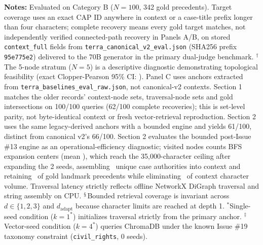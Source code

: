 \raggedright \fontsize{8.5}{10.5}\selectfont \textbf{Notes:} Evaluated on Category B ($N=100$, 342 gold precedents). Target coverage uses an exact CAP ID anywhere in context or a case-title prefix longer than four characters; complete recovery means every gold target matches, not independently verified connected-path recovery in Panels A/B, on stored \texttt{context\_full} fields from \texttt{terra\_canonical\_v2\_eval.json} (SHA256 prefix \texttt{95e775e2}) delivered to the 70B generator in the primary dual-judge benchmark.
$^\dagger$The 5-node stratum ($N=5$) is a descriptive diagnostic demonstrating topological feasibility (exact Clopper-Pearson 95\% CI: \CatBFiveNodeClopperPearsonCI).
Panel C uses anchors extracted from \texttt{terra\_baselines\_eval\_raw.json}, not canonical-v2 contexts. Section 1 matches the older records' context-node sets, traversal-node sets and gold intersections on 100/100 queries (62/100 complete recoveries); this is set-level parity, not byte-identical context or fresh vector-retrieval reproduction. Section 2 uses the same legacy-derived anchors with a bounded engine and yields 61/100, distinct from canonical v2's 66/100. Section 2 evaluates the bounded post-Issue \#13 engine as an operational-efficiency diagnostic; visited nodes counts BFS expansion centers (mean \IssueTwentySixBoundMeanVisitedNodes), which reach the 35,000-character ceiling after expanding the 2 seeds, assembling \IssueTwentySixBoundMeanFullNodes\ unique case authorities into context and retaining \IssueTwentySixGoldRetentionPct\ of gold landmark precedents while eliminating \IssueTwentySixContextReductionPct\ of context character volume. Traversal latency strictly reflects offline NetworkX DiGraph traversal and string assembly on CPU. $^\mathsection$Bounded retrieval coverage is invariant across $d \in \{1,2,3\}$ and $d_{\text{adapt}}$ because character limits are reached at depth 1. $^\ast$Single-seed condition ($k=1^\ast$) initializes traversal strictly from the primary anchor. $^\ddagger$Vector-seed condition ($k=4^\ast$) queries ChromaDB under the known Issue \#19 taxonomy constraint (\texttt{civil\_rights}, 0 seeds).
\endgroup



